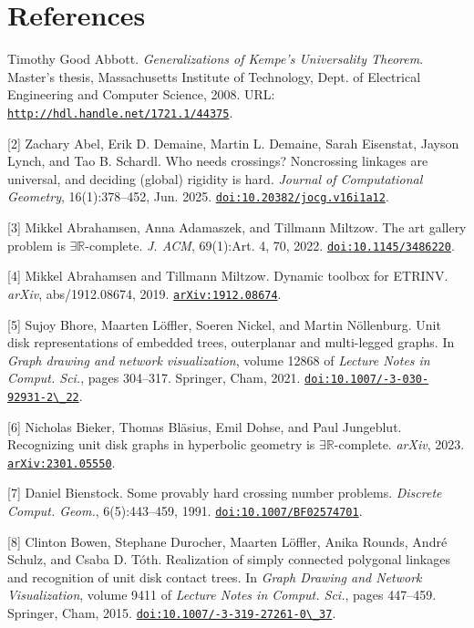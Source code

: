 \documentclass{article}
\begin{document}
\section*{References}
\begin{hangpars}
[1] Timothy Good Abbott. \emph{Generalizations of Kempe’s Universality Theorem}. Master’s thesis, Massachusetts Institute of Technology, Dept. of Electrical Engineering and Computer Science, 2008. URL: \href{http://hdl.handle.net/1721.1/44375}{\nolinkurl{http://hdl.handle.net/1721.1/44375}}.

[2] Zachary Abel, Erik D. Demaine, Martin L. Demaine, Sarah Eisenstat, Jayson Lynch, and Tao B. Schardl. Who needs crossings? Noncrossing linkages are universal, and deciding (global) rigidity is hard. \emph{Journal of Computational Geometry}, 16(1):378–452, Jun. 2025. \href{https://doi.org/10.20382/jocg.v16i1a12}{\nolinkurl{doi:10.20382/jocg.v16i1a12}}.

[3] Mikkel Abrahamsen, Anna Adamaszek, and Tillmann Miltzow. The art gallery problem is $\exists\mathbb{R}$-complete. \emph{J. ACM}, 69(1):Art. 4, 70, 2022. \href{https://doi.org/10.1145/3486220}{\nolinkurl{doi:10.1145/3486220}}.

[4] Mikkel Abrahamsen and Tillmann Miltzow. Dynamic toolbox for ETRINV. \emph{arXiv}, abs/1912.08674, 2019. \href{https://arxiv.org/abs/1912.08674}{\nolinkurl{arXiv:1912.08674}}.

[5] Sujoy Bhore, Maarten Löffler, Soeren Nickel, and Martin Nöllenburg. Unit disk representations of embedded trees, outerplanar and multi-legged graphs. In \emph{Graph drawing and network visualization}, volume 12868 of \emph{Lecture Notes in Comput. Sci.}, pages 304–317. Springer, Cham, 2021. \href{https://doi.org/10.1007/978-3-030-92931-2_22}{\texttt{doi:10.1007/-3-030-92931-2\textbackslash\_22}}.

[6] Nicholas Bieker, Thomas Bläsius, Emil Dohse, and Paul Jungeblut. Recognizing unit disk graphs in hyperbolic geometry is $\exists\mathbb{R}$-complete. \emph{arXiv}, 2023. \href{https://arxiv.org/abs/2301.05550}{\nolinkurl{arXiv:2301.05550}}.

[7] Daniel Bienstock. Some provably hard crossing number problems. \emph{Discrete Comput. Geom.}, 6(5):443–459, 1991. \href{https://doi.org/10.1007/BF02574701}{\nolinkurl{doi:10.1007/BF02574701}}.

[8] Clinton Bowen, Stephane Durocher, Maarten Löffler, Anika Rounds, André Schulz, and Csaba D. Tóth. Realization of simply connected polygonal linkages and recognition of unit disk contact trees. In \emph{Graph Drawing and Network Visualization}, volume 9411 of \emph{Lecture Notes in Comput. Sci.}, pages 447–459. Springer, Cham, 2015. \href{https://doi.org/10.1007/978-3-319-27261-0_37}{\texttt{doi:10.1007/-3-319-27261-0\textbackslash\_37}}.


\end{hangpars}
\end{document}
